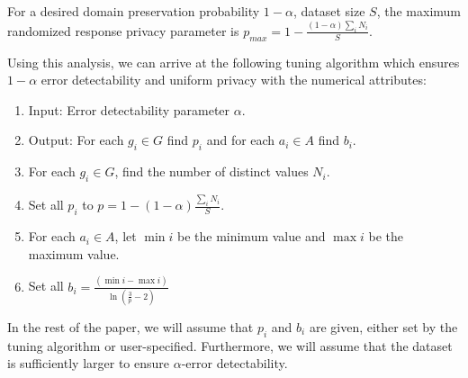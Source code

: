 \begin{corollary}
For a desired domain preservation probability $1-\alpha$, dataset size $S$,
the maximum randomized response privacy parameter is $p_{max}=1-\frac{(1-\alpha)\sum_{i}N_{i}}{S}$.
\end{corollary}
\iffalse
\begin{proof}
\[
\frac{\sum_{i}N}{1-p_{max}}\ln(\frac{1}{\alpha})\ge(\sum_{i}\frac{N_{i}}{1-p_{i}})\ln(\frac{1}{\alpha})
\]
\[
\frac{\sum_{i}N}{1-p_{max}}\ln(\frac{1}{\alpha})=S
\]
\[
\frac{1}{1-p_{max}}=\frac{S}{\ln(\frac{1}{\alpha})\sum_{i}N_i}
\]
\[
p_{max}\ge1-(1-\alpha)\frac{\sum_{i}N_i}{S}
\]
\end{proof}
\fi

Using this analysis, we can arrive at the following tuning algorithm which ensures $1-\alpha$ error detectability and uniform privacy with the numerical attributes:
\begin{enumerate}
\item \textsf{Input: } Error detectability parameter $\alpha$.
\item \textsf{Output: } For each $g_i \in G$ find $p_i$ and for each $a_i \in A$ find $b_i$.
\item For each $g_i \in G$, find the number of distinct values $N_i$.
\item Set all $p_i$ to $p = 1-(1-\alpha)\frac{\sum_{i}N_i}{S}$.
\item For each $a_i \in A$, let $\min i$ be the minimum value and $\max i$ be the maximum value.
\item Set all $b_i = \frac{(\min i - \max i)}{\ln (\frac{3}{p} - 2)}$ 
\end{enumerate}

In the rest of the paper, we will assume that $p_i$ and $b_i$ are given, either set by the tuning algorithm or user-specified.
Furthermore, we will assume that the dataset is sufficiently larger to ensure $\alpha$-error detectability.



